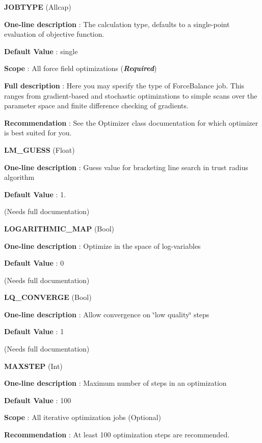 \begin{DoxyItemize}
\item {\bfseries  J\-O\-B\-T\-Y\-P\-E } (Allcap) \par
{\bfseries  One-\/line description }\-: The calculation type, defaults to a single-\/point evaluation of objective function. \par
{\bfseries  Default Value }\-: single \par
{\bfseries  Scope }\-: All force field optimizations ({\bfseries {\itshape Required}}) \par
{\bfseries  Full description }\-: Here you may specify the type of Force\-Balance job. This ranges from gradient-\/based and stochastic optimizations to simple scans over the parameter space and finite difference checking of gradients. \par
{\bfseries  Recommendation }\-: See the Optimizer class documentation for which optimizer is best suited for you.\end{DoxyItemize}
\begin{DoxyItemize}
\item {\bfseries  L\-M\-\_\-\-G\-U\-E\-S\-S } (Float) \par
{\bfseries  One-\/line description }\-: Guess value for bracketing line search in trust radius algorithm \par
{\bfseries  Default Value }\-: 1. \par
(Needs full documentation)\end{DoxyItemize}
\begin{DoxyItemize}
\item {\bfseries  L\-O\-G\-A\-R\-I\-T\-H\-M\-I\-C\-\_\-\-M\-A\-P } (Bool) \par
{\bfseries  One-\/line description }\-: Optimize in the space of log-\/variables \par
{\bfseries  Default Value }\-: 0 \par
(Needs full documentation)\end{DoxyItemize}
\begin{DoxyItemize}
\item {\bfseries  L\-Q\-\_\-\-C\-O\-N\-V\-E\-R\-G\-E } (Bool) \par
{\bfseries  One-\/line description }\-: Allow convergence on \char`\"{}low quality\char`\"{} steps \par
{\bfseries  Default Value }\-: 1 \par
(Needs full documentation)\end{DoxyItemize}
\begin{DoxyItemize}
\item {\bfseries  M\-A\-X\-S\-T\-E\-P } (Int) \par
{\bfseries  One-\/line description }\-: Maximum number of steps in an optimization \par
{\bfseries  Default Value }\-: 100 \par
{\bfseries  Scope }\-: All iterative optimization jobs (Optional) \par
{\bfseries  Recommendation }\-: At least 100 optimization steps are recommended.\end{DoxyItemize}
